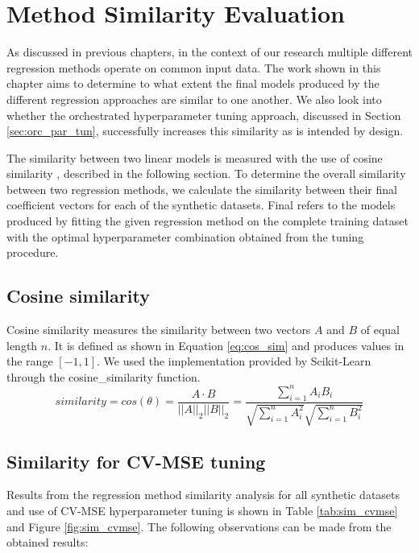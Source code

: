 \chapter{Method Similarity Evaluation}
As discussed in previous chapters, in the context of our research multiple different regression methods operate on common input data. The work shown in this chapter aims to determine to what extent the final models produced by the different regression approaches are similar to one another. We also look into whether the orchestrated hyperparameter tuning approach, discussed in Section \ref{sec:orc_par_tun}, successfully increases this similarity as is intended by design.

The similarity between two linear models is measured with the use of cosine similarity \cite{manning2008introduction}, described in the following section. To determine the overall similarity between two regression methods, we calculate the similarity between their final coefficient vectors for each of the synthetic datasets. Final refers to the models produced by fitting the given regression method on the complete training dataset with the optimal hyperparameter combination obtained from the tuning procedure.


\section{Cosine similarity}
Cosine similarity measures the similarity between two vectors $A$ and $B$ of equal length $n$. It is defined as shown in Equation \ref{eq:cos_sim} and produces values in the range $[-1,1]$. We used the implementation provided by Scikit-Learn through the cosine\_similarity function.
\begin{equation} \label{eq:cos_sim}
similarity = cos(\theta) = \frac{A \cdot B}{||A||_2||B||_2} = \frac{\sum_{i=1}^{n}A_iB_i}{\sqrt{\sum_{i=1}^{n}A_i^2}\sqrt{\sum_{i=1}^{n}B_i^2}}
\end{equation}


\section{Similarity for CV-MSE tuning} \label{sec:sim_cvmse}
Results from the regression method similarity analysis for all synthetic datasets and use of CV-MSE hyperparameter tuning is shown in Table \ref{tab:sim_cvmse} and Figure \ref{fig:sim_cvmse}. The following observations can be made from the obtained results:

